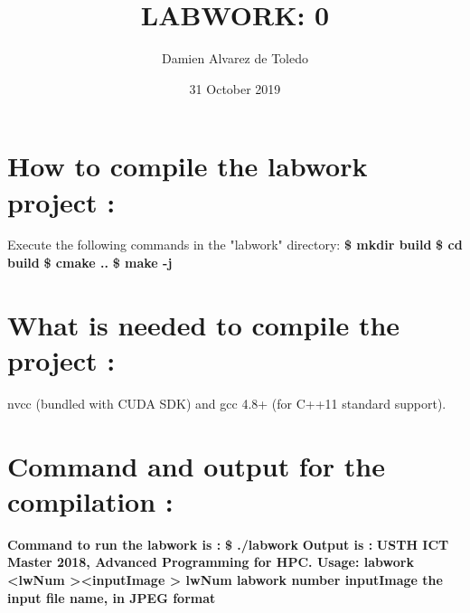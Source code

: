 \documentclass{article}
\title{LABWORK: 0}
\author{Damien Alvarez de Toledo }
\date{31 October 2019}
\begin{document}
\maketitle

\section{How to compile the labwork project : }

Execute the following commands in the "labwork" directory: \newline
\newline \textbf{\$ mkdir build}
\newline \textbf{\$ cd build}
\newline\textbf{ \$ cmake ..}
\newline \textbf{\$ make -j}

\section{What is needed to compile the project : }
\newline nvcc (bundled with CUDA SDK) and gcc 4.8+ (for C++11 standard support).

 \section{Command and output for the compilation : }
 \newline \textbf{Command to run the labwork is :}
 \newline
 \newline \textbf{\$ ./labwork}
 \newline
 \newline \textbf{Output is :}
 \newline
\textbf{ \newline USTH ICT Master 2018, Advanced Programming for HPC.
 \newline Usage: labwork  \textless lwNum \textgreater \textless inputImage \textgreater
 \newline lwNum        labwork number
  \newline inputImage   the input file name, in JPEG format}
   
   
 
 
 
 
 
\end{document}
